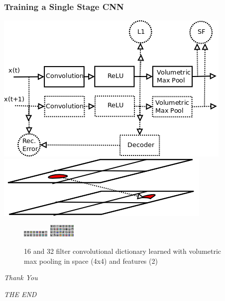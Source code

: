 \documentclass{beamer}
\begin{document}
\begin{frame} 
\frametitle{Training a Single Stage CNN}
\includegraphics[scale=0.25]{./figures/standard_model.png}
\includegraphics[scale=0.25]{./figures/volPool.png}\\
\begin{figure} 
\includegraphics[scale=2]{./figures/dec16.png} \hspace{1cm} 
\includegraphics[scale=2]{./figures/dec32.png}
\caption{16 and 32 filter convolutional dictionary learned with volumetric max pooling in space (4x4) and features (2) }
\end{figure} 
\end{frame} 


\begin{frame}
\centerline{
\huge
\emph{Thank You}} 
\vspace{10 mm} 
\centerline{
\huge
\emph{THE END}} 

\end{frame}
\end{document}
